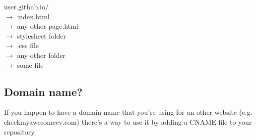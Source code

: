 \documentclass[a4paper,11pt]{article}
\begin{document}
\begin{spacing}{1.1}
user.github.io/ \\
     \qquad  $\rightarrow$ index.html \\
     \qquad  $\rightarrow$ any other page.html \\
     \qquad  $\rightarrow$ stylesheet folder \\
     \quad \quad \qquad $\rightarrow$ .css file \\
     \qquad  $\rightarrow$ any other folder \\
     \quad \quad \qquad $\rightarrow$ some file \\
\end{spacing}

\subsection{Domain name?}
If you happen to have a domain name that you're using for an other website (e.g. checkmyawesomecv.com) there's a way to use it by adding a CNAME file to your repository.
    
\end{document}
